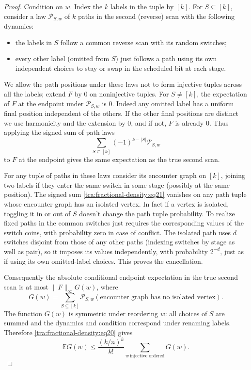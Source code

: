\begin{proof}
Condition on \(w\). Index the \(k\) labels in the tuple by \([k]\). For \(S\subseteq[k]\), consider a law \(\mathcal P_{S,w}\) of \(k\) paths in the second (reverse) scan with the following dynamics:
\begin{itemize}
\item the labels in \(S\) follow a common reverse scan with its random switches;
\item every other label (omitted from \(S\)) just follows a path using its own independent choices to stay or swap in the scheduled bit at each stage.

\end{itemize}
We allow the path positions under these laws not to form injective tuples across all the labels; extend \(F\) by 0 on noninjective tuples. For \(S\ne[k]\), the expectation of \(F\) at the endpoint under \(\mathcal P_{S,w}\) is 0. Indeed any omitted label has a uniform final position independent of the others. If the other final positions are distinct we use harmonicity and the extension by 0, and if not, \(F\) is already 0. Thus applying the signed sum of path laws
\begin{equation}
 \sum_{S\subseteq[k]} (-1)^{k-|S|}\mathcal P_{S,w}
 \label{tra:fractional-density:eq21}
\end{equation}
to \(F\) at the endpoint gives the same expectation as the true second scan.

\label{tra:fractional-density:isolated-cancellation-and-rooted-forest-count}
For any tuple of paths in these laws consider its encounter graph on \([k]\), joining two labels if they enter the same switch in some stage (possibly at the same position). The signed sum \eqref{tra:fractional-density:eq21} vanishes on any path tuple whose encounter graph has an isolated vertex. In fact if a vertex is isolated, toggling it in or out of \(S\) doesn't change the path tuple probability. To realize fixed paths in the common switches just requires the corresponding values of the switch coins, with probability zero in case of conflict. The isolated path uses \(d\) switches disjoint from those of any other paths (indexing switches by stage as well as pair), so it imposes its values independently, with probability \(2^{-d}\), just as if using its own omitted-label choices. This proves the cancellation.

Consequently the absolute conditional endpoint expectation in the true second scan is at most \(\|F\|_\infty G(w)\), where
\[
 G(w)=\sum_{S\subseteq[k]}\mathcal P_{S,w}(\text{encounter graph has no isolated vertex}).
\]
The function \(G(w)\) is symmetric under reordering \(w\): all choices of \(S\) are summed and the dynamics and condition correspond under renaming labels. Therefore \eqref{tra:fractional-density:eq20} gives
\begin{equation}
 \mathbb E G(w)\le \frac{(k/n)^k}{k!}\sum_{w\ \text{injective ordered}} G(w).
 \label{tra:fractional-density:eq22}
\end{equation}


\end{proof}
